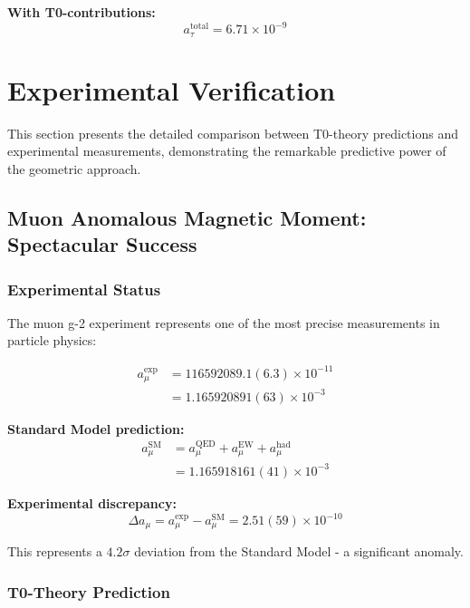 \documentclass[12pt,a4paper]{article}
\numberwithin{equation}{section}
\begin{document}
	\textbf{With T0-contributions:}
	\begin{equation}
		a_\tau^{\text{total}} = 6.71 \times 10^{-9}
		\label{eq:tau_total}
	\end{equation}
	
	\section{Experimental Verification}
	
	This section presents the detailed comparison between T0-theory predictions and experimental measurements, demonstrating the remarkable predictive power of the geometric approach.
	
	\subsection{Muon Anomalous Magnetic Moment: Spectacular Success}
	
	\subsubsection{Experimental Status}
	
	The muon g-2 experiment represents one of the most precise measurements in particle physics:
	
	\begin{align}
		a_\mu^{\exp} &= 116592089.1(6.3) \times 10^{-11} \\
		&= 1.165920891(63) \times 10^{-3}
		\label{eq:muon_exp_precise}
	\end{align}
	
	\textbf{Standard Model prediction:}
	\begin{align}
		a_\mu^{\text{SM}} &= a_\mu^{\text{QED}} + a_\mu^{\text{EW}} + a_\mu^{\text{had}} \\
		&= 1.165918161(41) \times 10^{-3}
		\label{eq:muon_sm_prediction}
	\end{align}
	
	\textbf{Experimental discrepancy:}
	\begin{equation}
		\Delta a_\mu = a_\mu^{\exp} - a_\mu^{\text{SM}} = 2.51(59) \times 10^{-10}
		\label{eq:muon_discrepancy}
	\end{equation}
	
	This represents a $4.2\sigma$ deviation from the Standard Model - a significant anomaly.
	
	\subsubsection{T0-Theory Prediction}
	
\end{document}
